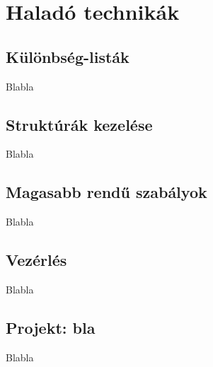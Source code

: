 \chapter{Haladó technikák}
\section{Különbség-listák}
Blabla
\section{Struktúrák kezelése}
Blabla
\section{Magasabb rendű szabályok}
Blabla
\section{Vezérlés}
Blabla
\section{Projekt: bla}
Blabla
